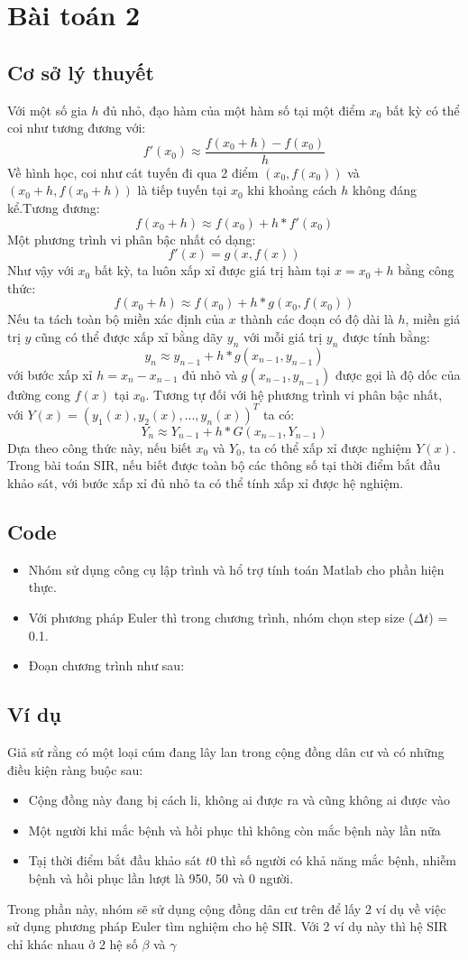 \newpage
\section{Bài toán 2}
\subsection{Cơ sở lý thuyết}
Với một số gia $h$ đủ nhỏ, đạo hàm của một hàm số tại một điểm $x_0$ bất kỳ có thể coi như tương đương với:
\[f'(x_0) \approx \frac{f(x_0+h)-f(x_0)}{h}\]
Về hình học, coi như cát tuyến đi qua 2 điểm $(x_0, f(x_0))$ và $(x_0+h, f(x_0+h))$ là tiếp tuyến tại $x_0$ khi khoảng cách $h$ không đáng kể.Tương đương:
\[ f(x_0+h) \approx f(x_0) + h*f'(x_0) \]
Một phương trình vi phân bậc nhất có dạng:
\[  f'(x) = g(x,f(x))  \]
Như vậy với $x_0$ bất kỳ, ta luôn xấp xỉ được giá trị hàm tại $x=x_0+h$ bằng công thức:
\[ f(x_0+h) \approx f(x_0) + h*g(x_0,f(x_0)) \]
Nếu ta tách toàn bộ miền xác định của $x$ thành các đoạn có độ dài là $h$, miền giá trị $y$ cũng có thể được xấp xỉ bằng dãy ${y_n}$ với mỗi giá trị $y_n$ được tính bằng:
\[ y_n \approx y_{n-1} + h*g(x_{n-1},y_{n-1}) \]
với bước xấp xỉ $h = x_n - x_{n-1}$ đủ nhỏ và $g(x_{n-1},y_{n-1})$ được gọi là độ dốc của đường cong $f(x)$ tại $x_0$. Tương tự đối với hệ phương trình vi phân bậc nhất, với $Y(x) = (y_1(x), y_2(x),... , y_n(x))^T$ ta có:
\[ Y_n \approx Y_{n-1} + h*G(x_{n-1},Y_{n-1}) \]
Dựa theo công thức này, nếu biết $x_0$ và $Y_0$, ta có thể xấp xỉ được nghiệm $Y(x)$. Trong bài toán SIR, nếu biết được toàn bộ các thông số tại thời điểm bắt đầu khảo sát, với bước xấp xỉ đủ nhỏ ta có thể tính xấp xỉ được hệ nghiệm.
\subsection{Code}\label{Code-Euler}
\begin{itemize}
\item Nhóm sử dụng công cụ lập trình và hổ trợ tính toán Matlab cho phần hiện thực.
\item Với phương pháp Euler thì trong chương trình, nhóm chọn step size ($ \Delta t $) = 0.1. 
\item Đoạn chương trình như sau:

\end{itemize}
\subsection{Ví dụ}
Giả sử rằng có một loại cúm đang lây lan trong cộng đồng dân cư và có những điều kiện ràng buộc sau:
	\begin{itemize}
		\item Cộng đồng này đang bị cách li, không ai được ra và cũng không ai được vào
		\item Một người khi mắc bệnh và hồi phục thì không còn mắc bệnh này lần nữa
		\item Tạị thời điểm bắt đầu khảo sát $t0$ thì số người có khả năng mắc bệnh, nhiễm bệnh và hồi phục lần lượt là 950, 50 và 0 người.
	 \end{itemize}
Trong phần này, nhóm sẽ sử dụng cộng đồng dân cư trên để lấy 2 ví dụ về việc sử dụng phương pháp Euler tìm nghiệm cho hệ SIR. Với 2 ví dụ này thì hệ SIR chỉ khác nhau ở 2 hệ số $ \beta $ và $ \gamma $
